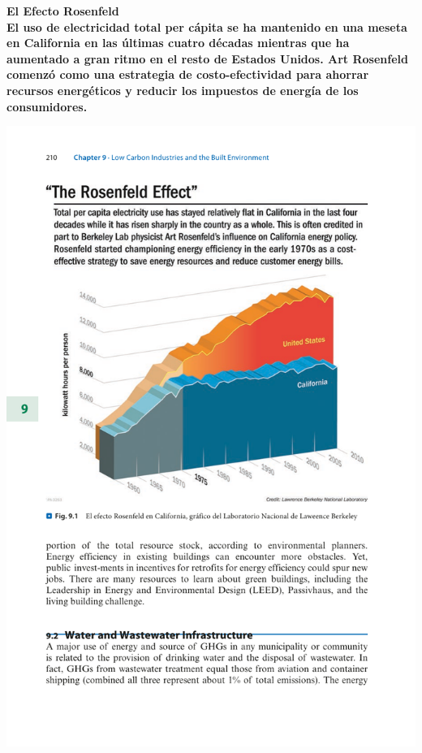\documentclass[runningheads]{llncs}
\begin{document}
\textbf{El Efecto Rosenfeld\\
El uso de electricidad total per cápita se ha mantenido en una meseta en California en las últimas cuatro décadas mientras que ha aumentado a gran ritmo en el resto de Estados Unidos. Art Rosenfeld comenzó como una estrategia de costo-efectividad para ahorrar recursos energéticos y reducir los impuestos de energía de los consumidores.}

\includegraphics[scale=0.95]{9(1).pdf}
\end{document}
